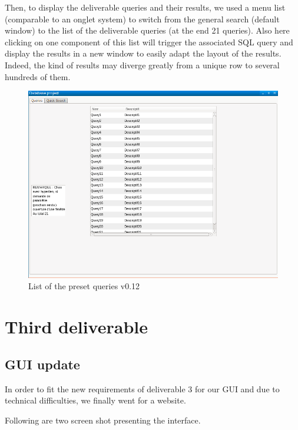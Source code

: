 \documentclass{article}
\begin{document}
Then, to display the deliverable queries and their results, we used a menu list (comparable to an onglet system) to switch from the general search (default window) to the list of the deliverable queries (at the end 21 queries). Also here clicking on one component of this list will trigger the associated SQL query and display the results in a new window to easily adapt the layout of the results. Indeed, the kind of results may diverge greatly from a unique row to several hundreds of them.
\begin{figure}[H]
        \includegraphics[width=\linewidth]{preset_list.png}
        \captionsetup{justification=centering}
        \caption{List of the preset queries v0.12}
    \end{figure}
\section{Third deliverable}

\subsection{GUI update}

In order to fit the new requirements of deliverable 3 for our GUI and due to technical difficulties, we finally went for a website.

Following are two screen shot presenting the interface.
\end{document}
